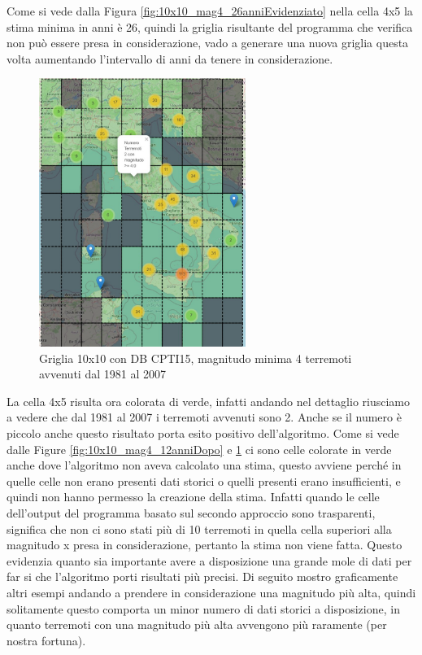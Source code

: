 Come si vede dalla Figura  \ref{fig:10x10_mag4_26anniEvidenziato} nella cella 4x5 la stima minima in anni \`e 26, quindi la griglia risultante del programma che verifica non pu\`o essere presa in considerazione, vado a generare una nuova griglia questa volta aumentando l'intervallo di anni da tenere in considerazione.

\begin{figure}[H]
   \centering
   \includegraphics[width=0.600\textwidth]{images/10x10_mag4_26anniDopo_CPTI15.jpg}
   \caption{Griglia 10x10 con DB CPTI15, magnitudo minima 4 terremoti avvenuti dal 1981 al 2007}
   \label{fig:10x10_mag4_26anniDopo}
\end{figure}

La cella 4x5 risulta ora colorata di verde, infatti andando nel dettaglio riusciamo a vedere che dal 1981 al 2007 i terremoti avvenuti sono 2. Anche se il numero \`e piccolo anche questo risultato porta esito positivo dell'algoritmo. Come si vede dalle Figure \ref{fig:10x10_mag4_12anniDopo} e \ref{fig:10x10_mag4_26anniDopo} ci sono celle colorate in verde anche dove l'algoritmo non aveva calcolato una stima, questo avviene perch\'e in quelle celle non erano presenti dati storici o quelli presenti erano insufficienti, e quindi non hanno permesso la creazione della stima. Infatti quando le celle dell'output del programma basato sul secondo approccio sono trasparenti, significa che non ci sono stati pi\`u di 10 terremoti in quella cella superiori alla magnitudo x presa in considerazione, pertanto la stima non viene fatta. Questo evidenzia quanto sia importante avere a disposizione una grande mole di dati per far si che l'algoritmo porti risultati pi\`u precisi. Di seguito mostro graficamente altri esempi andando a prendere in considerazione una magnitudo pi\`u alta, quindi solitamente questo comporta un minor numero di dati storici a disposizione, in quanto terremoti con una magnitudo pi\`u alta avvengono pi\`u raramente (per nostra fortuna).


